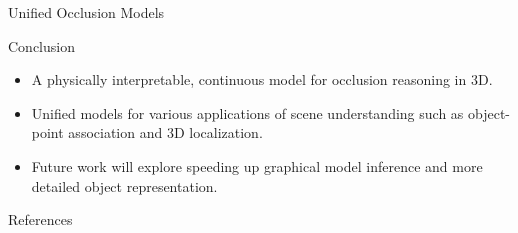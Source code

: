 \documentclass[handout,final]{beamer}
\newlength{\onecolwid}
\begin{document}
\begin{frame}[t]
\begin{columns}[t]
\begin{column}{\onecolwid}
\begin{block}{Unified Occlusion Models}
      \end{block}
      \begin{block}{Conclusion}
        \begin{itemize}
          \item A physically interpretable, continuous model for occlusion reasoning in 3D.
          \item Unified models for various applications of scene understanding such as object-point association and 3D localization.
          \item Future work will explore speeding up graphical model inference and more detailed object representation.
        \end{itemize}
      \end{block}

      \begin{block}{References}
        
        
      \end{block}
    \end{column}
  \end{columns}
\end{frame}
\end{document}
